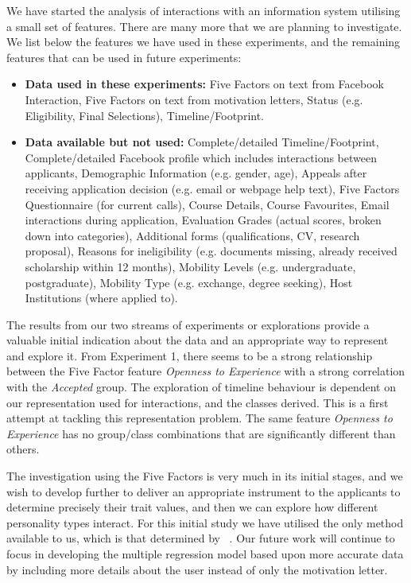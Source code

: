 \documentclass[letterpaper]{article}
\begin{document}
We have started the analysis of interactions with an information
system utilising a small set of features. There are many more that we
are planning to investigate. We list below the features we have used
in these experiments, and the remaining features that can be used in
future experiments:

\begin{itemize}
\item {\textbf{Data used in these experiments:}} Five Factors on text
  from Facebook Interaction, Five Factors on text from motivation
  letters, Status (e.g. Eligibility, Final Selections),
  Timeline/Footprint.
\item {\textbf{Data available but not used:}} Complete/detailed
  Timeline/Footprint, Complete/detailed Facebook profile which
  includes interactions between applicants, Demographic Information
  (e.g. gender, age), Appeals after receiving application decision
  (e.g. email or webpage help text), Five Factors Questionnaire (for
  current calls), Course Details, Course Favourites, Email
  interactions during application, Evaluation Grades (actual scores,
  broken down into categories), Additional forms (qualifications, CV,
  research proposal), Reasons for ineligibility (e.g. documents
  missing, already received scholarship within 12 months), Mobility
  Levels (e.g. undergraduate, postgraduate), Mobility Type
  (e.g. exchange, degree seeking), Host Institutions (where applied to).
\end{itemize}

The results from our two streams of experiments or explorations
provide a valuable initial indication about the data and an
appropriate way to represent and explore it. From Experiment 1, there
seems to be a strong relationship between the Five Factor feature
{\emph{Openness to Experience}} with a strong correlation with the
{\emph{Accepted}} group. The exploration of timeline behaviour is
dependent on our representation used for interactions, and the classes
derived. This is a first attempt at tackling this representation
problem. The same feature {\emph{Openness to Experience}} has no
group/class combinations that are significantly different than others.

The investigation using the Five Factors is very much in its initial
stages, and we wish to develop further to deliver an appropriate
instrument to the applicants to determine precisely their trait
values, and then we can explore how different personality types
interact. For this initial study we have utilised the only method
available to us, which is that determined by
\citeauthor{mairesse-et-al:2007}~. Our
future work will continue to focus in developing the multiple
regression model based upon more accurate data by including more
details about the user instead of only the motivation letter.
\end{document}
